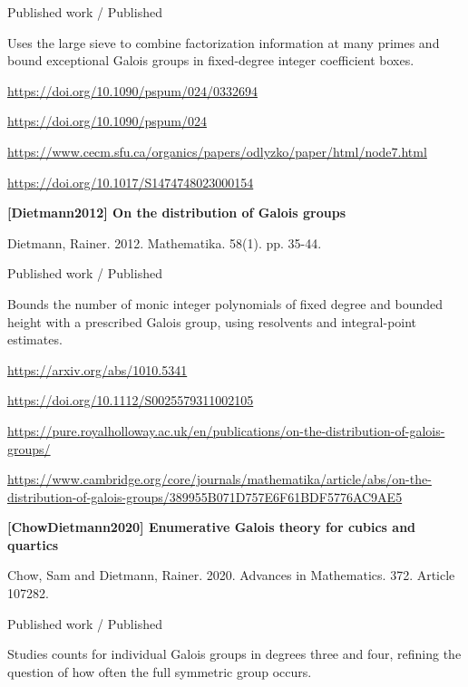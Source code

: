 \documentclass[11pt,a4paper,oneside,openany]{book}
\begin{document}
{\small\sffamily\color{atlasgold}Published work / Published}\par
\color{black} Uses the large sieve to combine factorization information at many primes and bound exceptional Galois groups in fixed-degree integer coefficient boxes.\par
{\footnotesize\url{https://doi.org/10.1090/pspum/024/0332694}}\par
{\footnotesize\url{https://doi.org/10.1090/pspum/024}}\par
{\footnotesize\url{https://www.cecm.sfu.ca/organics/papers/odlyzko/paper/html/node7.html}}\par
{\footnotesize\url{https://doi.org/10.1017/S1474748023000154}}\par
\vspace{9pt}
\hypertarget{ref:Dietmann2012}{}
{\sffamily\bfseries\color{atlasgreen}[Dietmann2012] On the distribution of Galois groups}\par
\color{black} Dietmann, Rainer. 2012. Mathematika. 58(1). pp. 35-44.\par
{\small\sffamily\color{atlasgold}Published work / Published}\par
\color{black} Bounds the number of monic integer polynomials of fixed degree and bounded height with a prescribed Galois group, using resolvents and integral-point estimates.\par
{\footnotesize\url{https://arxiv.org/abs/1010.5341}}\par
{\footnotesize\url{https://doi.org/10.1112/S0025579311002105}}\par
{\footnotesize\url{https://pure.royalholloway.ac.uk/en/publications/on-the-distribution-of-galois-groups/}}\par
{\footnotesize\url{https://www.cambridge.org/core/journals/mathematika/article/abs/on-the-distribution-of-galois-groups/389955B071D757E6F61BDF5776AC9AE5}}\par
\vspace{9pt}
\hypertarget{ref:ChowDietmann2020}{}
{\sffamily\bfseries\color{atlasgreen}[ChowDietmann2020] Enumerative Galois theory for cubics and quartics}\par
\color{black} Chow, Sam and Dietmann, Rainer. 2020. Advances in Mathematics. 372. Article 107282.\par
{\small\sffamily\color{atlasgold}Published work / Published}\par
\color{black} Studies counts for individual Galois groups in degrees three and four, refining the question of how often the full symmetric group occurs.\par
\end{document}
